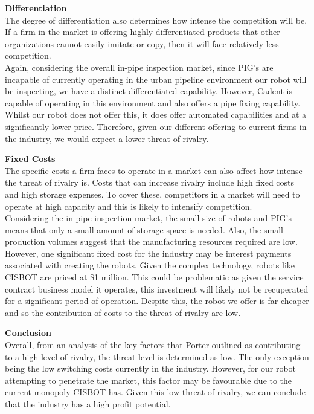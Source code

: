 \documentclass[11pt]{article}		%
\begin{document}
	        \textbf{Differentiation}\\
	        The degree of differentiation also determines how intense the competition will be. If a firm in the market is offering highly differentiated products that other organizations cannot easily imitate or copy, then it will face relatively less competition.\\
	        \hspace*{3ex}Again, considering the overall in-pipe inspection market, since PIG’s are incapable of currently operating in the urban pipeline environment our robot will be inspecting, we have a distinct differentiated capability. However, Cadent is capable of operating in this environment and also offers a pipe fixing capability. Whilst our robot does not offer this, it does offer automated capabilities and at a significantly lower price. Therefore, given our different offering to current firms in the industry, we would expect a lower threat of rivalry. 
	        
	        \textbf{Fixed Costs}\\
	        The specific costs a firm faces to operate in a market can also affect how intense the threat of rivalry is. Costs that can increase rivalry include high fixed costs and high storage expenses. To cover these, competitors in a market will need to operate at high capacity and this is likely to intensify competition.\\
	        \hspace*{3ex}Considering the in-pipe inspection market, the small size of robots and PIG’s means that only a small amount of storage space is needed. Also, the small production volumes suggest that the manufacturing resources required are low. However, one significant fixed cost for the industry may be interest payments associated with creating the robots. Given the complex technology, robots like CISBOT are priced at \$1 million. This could be problematic as given the service contract business model it operates, this investment will likely not be recuperated for a significant period of operation. Despite this, the robot we offer is far cheaper and so the contribution of costs to the threat of rivalry are low. 
	        
	        \textbf{Conclusion}\\
	        Overall, from an analysis of the key factors that Porter outlined as contributing to a high level of rivalry, the threat level is determined as low. The only exception being the low switching costs currently in the industry. However, for our robot attempting to penetrate the market, this factor may be favourable due to the current monopoly CISBOT has. Given this low threat of rivalry, we can conclude that the industry has a high profit potential.
\end{document}
